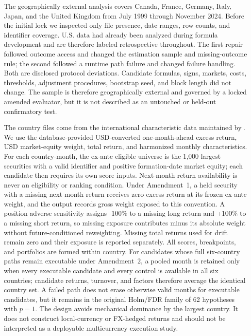 \documentclass[11pt]{article}
\begin{document}
The geographically external analysis covers Canada, France, Germany, Italy, Japan, and the United Kingdom from July 1999 through November 2024. Before the initial lock we inspected only file presence, date ranges, row counts, and identifier coverage. U.S. data had already been analyzed during formula development and are therefore labeled retrospective throughout. The first repair followed outcome access and changed the estimation sample and missing-outcome rule; the second followed a runtime path failure and changed failure handling. Both are disclosed protocol deviations. Candidate formulas, signs, markets, costs, thresholds, adjustment procedures, bootstrap seed, and block length did not change. The sample is therefore geographically external and governed by a locked amended evaluator, but it is not described as an untouched or held-out confirmatory test.

The country files come from the international characteristic data maintained by \citet{JensenKellyPedersen2023}. We use the database-provided USD-converted one-month-ahead excess return, USD market-equity weight, total return, and harmonized monthly characteristics. For each country-month, the ex-ante eligible universe is the 1,000 largest securities with a valid identifier and positive formation-date market equity; each candidate then requires its own score inputs. Next-month return availability is never an eligibility or ranking condition. Under Amendment~1, a held security with a missing next-month return receives zero excess return at its frozen ex-ante weight, and the output records gross weight exposed to this convention. A position-adverse sensitivity assigns -100\% to a missing long return and +100\% to a missing short return, so missing exposure contributes minus its absolute weight without future-conditioned reweighting. Missing total returns used for drift remain zero and their exposure is reported separately. All scores, breakpoints, and portfolios are formed within country. For candidates whose full six-country paths remain executable under Amendment~2, a pooled month is retained only when every executable candidate and every control is available in all six countries; candidate returns, turnover, and factors therefore average the identical country set. A failed path does not erase otherwise valid months for executable candidates, but it remains in the original Holm/FDR family of 62 hypotheses with $p=1$. The design avoids mechanical dominance by the largest country. It does not construct local-currency or FX-hedged returns and should not be interpreted as a deployable multicurrency execution study.
\end{document}
